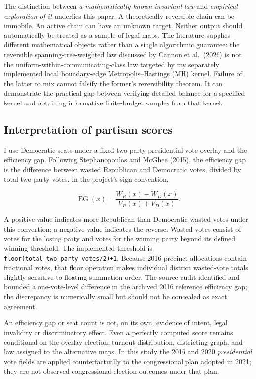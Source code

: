 \documentclass[
  10pt,
]{article}
\begin{document}
The distinction between \emph{a mathematically known invariant law} and
\emph{empirical exploration of it} underlies this paper. A theoretically
reversible chain can be immobile. An active chain can have an unknown
target. Neither output should automatically be treated as a sample of
legal maps. The literature supplies different mathematical objects
rather than a single algorithmic guarantee: the reversible
spanning-tree-weighted law discussed by Cannon et al.~(2026) is not the
uniform-within-communicating-class law targeted by my separately
implemented local boundary-edge Metropolis--Hastings (MH) kernel.
Failure of the latter to mix cannot falsify the former's reversibility
theorem. It can demonstrate the practical gap between verifying detailed
balance for a specified kernel and obtaining informative finite-budget
samples from that kernel.

\hypertarget{interpretation-of-partisan-scores}{%
\subsection{Interpretation of partisan
scores}\label{interpretation-of-partisan-scores}}

I use Democratic seats under a fixed two-party presidential vote
overlay and the efficiency gap. Following Stephanopoulos and McGhee
(2015), the efficiency gap is the difference between wasted Republican
and Democratic votes, divided by total two-party votes. In the project's
sign convention,

\begin{equation}
\operatorname{EG}(x)
=\frac{W_R(x)-W_D(x)}{V_R(x)+V_D(x)}.
\end{equation}

A positive value indicates more Republican than Democratic wasted votes
under this convention; a negative value indicates the reverse. Wasted
votes consist of votes for the losing party and votes for the winning
party beyond its defined winning threshold. The implemented threshold is
\texttt{floor(total\_two\_party\_votes/2)+1}. Because 2016 precinct
allocations contain fractional votes, that floor operation makes
individual district wasted-vote totals slightly sensitive to floating
summation order. The source audit identified and bounded a
one-vote-level difference in the archived 2016 reference efficiency gap;
the discrepancy is numerically small but should not be concealed as
exact agreement.

An efficiency gap or seat count is not, on its own, evidence of intent,
legal invalidity or discriminatory effect. Even a perfectly computed
score remains conditional on the overlay election, turnout distribution,
districting graph, and law assigned to the alternative maps. In this
study the 2016 and 2020 \emph{presidential} vote fields are applied
counterfactually to the congressional plan adopted in 2021; they are not
observed congressional-election outcomes under that plan.
\end{document}
